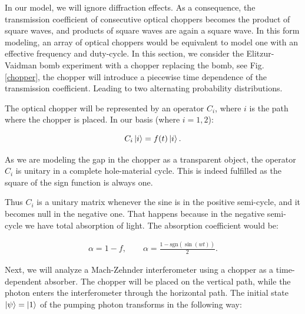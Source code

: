 \documentclass[12pt]{book}
\begin{document}
In our model, we will ignore diffraction effects. As a consequence, the transmission coefficient of consecutive optical choppers becomes the product of square waves, and products of square waves are again a square wave. In this form modeling, an array of optical choppers would be equivalent to model one with an effective frequency and duty-cycle. In this section, we consider the Elitzur-Vaidman bomb experiment with a chopper replacing the bomb, see Fig. \ref{chopper}, the chopper will introduce a piecewise time dependence of the transmission coefficient. Leading to two alternating probability distributions.


The optical chopper will be represented by an operator $C_{i}$, where $i$ is the path where the chopper is placed. In our basis (where $i=1,2$):

\begin{equation}
C_{i}\ket{i}=f(t)\ket{i}.
\end{equation}

As we are modeling the gap in the chopper as a transparent object, the operator $C_i$ is unitary in a complete hole-material cycle.  This is indeed fulfilled as the square of the sign function is always one.


Thus $C_{i}$ is a unitary matrix whenever the sine is in the positive semi-cycle, and it becomes null in the negative one. That happens because in the negative semi-cycle we have total absorption of light. The absorption coefficient would  be:  

\begin{align}
 \alpha=1-f,\qquad \alpha=\frac{1-\mathrm{sgn}(\sin(wt))}{2}.
\end{align}

Next, we will analyze a Mach-Zehnder interferometer using a chopper as a time-dependent absorber. The chopper will be placed on the vertical path, while the photon enters the interferometer through the horizontal path. The initial state $\ket{\psi}=\ket{1}$ of the pumping photon transforms in the following way:
\end{document}
